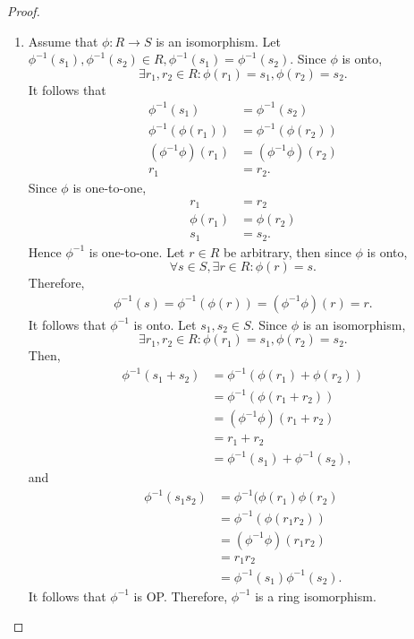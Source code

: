 \documentclass{article}
\theoremstyle{definition}
\begin{document}
\begin{proof}
\begin{enumerate}
         \item Assume that $\phi:R \to S$ is an isomorphism. Let $\phi^{-1}(s_1),\phi^{-1}(s_2)\in R, \phi^{-1}(s_1)=\phi^{-1}(s_2)$. Since $\phi$ is onto,
         \begin{equation*}
             \exists r_1,r_2 \in R: \phi(r_1)=s_1, \phi(r_2)=s_2.
         \end{equation*}
         It follows that
         \begin{align*}
             \phi^{-1}(s_1)&=\phi^{-1}(s_2) \\
             \phi^{-1}(\phi(r_1))&=\phi^{-1}(\phi(r_2)) \\
             (\phi^{-1}\phi)(r_1)&=(\phi^{-1}\phi)(r_2) \\
             r_1&=r_2.
         \end{align*}
         Since $\phi$ is one-to-one,
         \begin{align*}
             r_1&=r_2 \\
             \phi(r_1)&=\phi(r_2) \\
             s_1&=s_2.
         \end{align*}
         Hence $\phi^{-1}$ is one-to-one. Let $r\in R$ be arbitrary, then since $\phi$ is onto, 
         \begin{equation*}
             \forall s \in S, \exists r \in R: \phi(r)=s.
         \end{equation*}
         Therefore,
         \begin{align*}
             \phi^{-1}(s)=\phi^{-1}(\phi(r))=(\phi^{-1}\phi)(r)=r.
         \end{align*}
         It follows that $\phi^{-1}$ is onto. Let $s_1,s_2\in S$. Since $\phi$ is an isomorphism, 
         \begin{equation*}
             \exists r_1,r_2\in R: \phi(r_1)=s_1, \phi(r_2)=s_2.
         \end{equation*}
         Then,
         \begin{align*}
             \phi^{-1}(s_1+s_2)&=\phi^{-1}(\phi(r_1)+\phi(r_2)) \\
             &=\phi^{-1}(\phi(r_1+r_2)) \\
             &=(\phi^{-1}\phi)(r_1+r_2) \\
             &=r_1+r_2 \\
             &=\phi^{-1}(s_1)+\phi^{-1}(s_2),
         \end{align*}
         and
         \begin{align*}
             \phi^{-1}(s_1s_2)&=\phi^{-1}(\phi(r_1)\phi(r_2) \\
             &=\phi^{-1}(\phi(r_1r_2)) \\
             &=(\phi^{-1}\phi)(r_1r_2) \\
             &= r_1r_2 \\
             &= \phi^{-1}(s_1)\phi^{-1}(s_2).
         \end{align*}
         It follows that $\phi^{-1}$ is OP. Therefore, $\phi^{-1}$ is a ring isomorphism. 
     \end{enumerate}
\end{proof}
\end{document}
